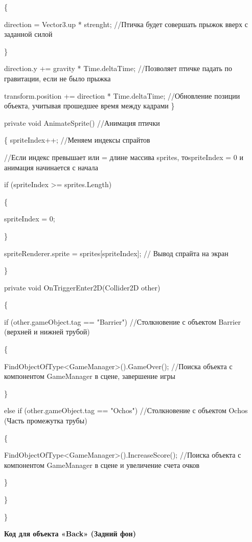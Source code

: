 \documentclass[14pt, oneside]{altsu-report}
\begin{document}
        \{

            direction = Vector3.up * strenght; //Птичка будет совершать прыжок вверх с заданной силой

        \}

        direction.y += gravity * Time.deltaTime; //Позволяет птичке падать по гравитации, если не было прыжка

        transform.position += direction * Time.deltaTime; //Обновление позиции объекта, учитывая прошедшее время между кадрами
    \}
 
    private void AnimateSprite() //Анимация птички

    \{
        spriteIndex++; //Меняем индексы спрайтов
        
	//Если индекс превышает или = длине массива sprites, тоspriteIndex = 0 и анимация начинается с начала

        if (spriteIndex >= sprites.Length)

        \{

            spriteIndex = 0;

        \}

        spriteRenderer.sprite = sprites[spriteIndex]; // Вывод спрайта на экран

    \}

    private void OnTriggerEnter2D(Collider2D other)

    \{

        if (other.gameObject.tag == "Barrier") //Столкновение с объектом Barrier (верхней и нижней трубой)

        \{

            FindObjectOfType<GameManager>().GameOver(); //Поиска объекта с компонентом GameManager в сцене, завершение игры

        \}

        else if (other.gameObject.tag == "Ochos") //Столкновение с объектом Ochos (Часть промежутка трубы)

        \{

            FindObjectOfType<GameManager>().IncreaseScore(); //Поиска объекта с компонентом GameManager в сцене и увеличение счета очков

        \}

    \}

\}


\begin{center}
\label{code:appendix}\textbf{Код для объекта «Back» (Задний фон)} 
\end{center}
\end{document}
